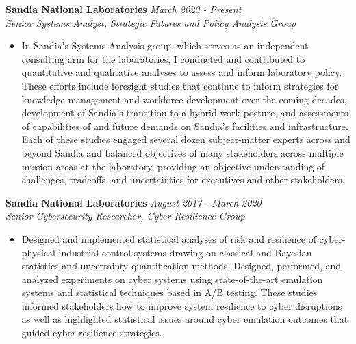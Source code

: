 \documentclass[11pt]{article}
\newenvironment{changemargin}[2]{%
  \begin{list}{}{%
    \setlength{\topsep}{0pt}%
    \setlength{\leftmargin}{#1}%
    \setlength{\rightmargin}{#2}%
    \setlength{\listparindent}{\parindent}%
    \setlength{\itemindent}{\parindent}%
    \setlength{\parsep}{\parskip}%
  }%
  \item[]}{\end{list}
}
\newenvironment{body} {
	\vspace*{-16pt}
	\begin{changemargin}{-0.25in}{-0.5in}
  }	
	{\end{changemargin}
}
\begin{document}
\begin{body}
	\vspace{12pt}
	
	\textbf{Sandia National Laboratories} \hfill \emph{March 2020 - Present}\\
	\emph{Senior Systems Analyst, Strategic Futures and Policy Analysis Group}
	\vspace*{-4pt}
	\begin{itemize}
		\item In Sandia's Systems Analysis group, which serves as an independent consulting arm for the laboratories, I conducted and contributed to quantitative and qualitative analyses to assess and inform laboratory policy. These efforts include foresight studies that continue to inform strategies for knowledge management and workforce development over the coming decades, development of Sandia's transition to a hybrid work posture, and assessments of capabilities of and future demands on Sandia's facilities and infrastructure. Each of these studies engaged several dozen subject-matter experts across and beyond Sandia and balanced objectives of many stakeholders across multiple mission areas at the laboratory, providing an objective understanding of challenges, tradeoffs, and uncertainties for executives and other stakeholders.
	\end{itemize}	
	
	\textbf{Sandia National Laboratories} \hfill \emph{August 2017 - March 2020}\\
	\emph{Senior Cybersecurity Researcher, Cyber Resilience Group}
	\vspace*{-4pt}
	\begin{itemize}
		\item Designed and implemented statistical analyses of risk and resilience of cyber-physical industrial control systems drawing on classical and Bayesian statistics and uncertainty quantification methods. Designed, performed, and analyzed experiments on cyber systems using state-of-the-art emulation systems and statistical techniques based in A/B testing. These studies informed stakeholders how to improve system resilience to cyber disruptions as well as highlighted statistical issues around cyber emulation outcomes that guided cyber resilience strategies.
	\end{itemize}	
	
	

\end{body}
\end{document}

